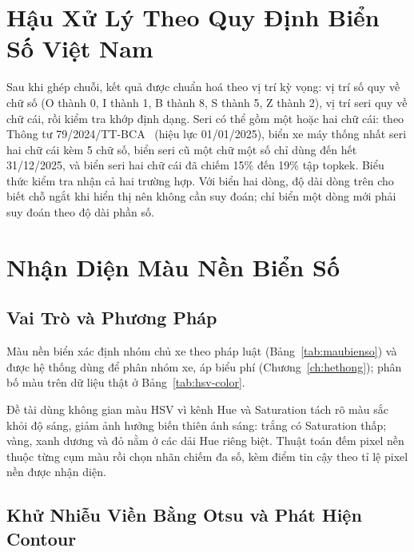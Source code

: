 \section{Hậu Xử Lý Theo Quy Định Biển Số Việt Nam}
\label{sec:ocr-hauxy}

Sau khi ghép chuỗi, kết quả được chuẩn hoá theo vị trí kỳ vọng: vị trí số quy về chữ số (O
thành 0, I thành 1, B thành 8, S thành 5, Z thành 2), vị trí seri quy về chữ cái, rồi kiểm
tra khớp định dạng. Seri có thể gồm một hoặc hai chữ cái: theo Thông tư
79/2024/TT-BCA~\autocite{tt792024bca} (hiệu lực 01/01/2025), biển xe máy thống nhất seri hai
chữ cái kèm 5 chữ số, biển seri cũ một chữ một số chỉ dùng đến hết 31/12/2025, và biển seri
hai chữ cái đã chiếm 15\% đến 19\% tập topkek. Biểu thức kiểm tra nhận cả hai trường hợp. Với
biển hai dòng, độ dài dòng trên cho biết chỗ ngắt khi hiển thị nên không cần suy đoán; chỉ
biển một dòng mới phải suy đoán theo độ dài phần số.

\section{Nhận Diện Màu Nền Biển Số}
\label{sec:mau-bien}

\subsection{Vai Trò và Phương Pháp}

Màu nền biển xác định nhóm chủ xe theo pháp luật (Bảng~\ref{tab:maubienso}) và được hệ thống
dùng để phân nhóm xe, áp biểu phí (Chương~\ref{ch:hethong}); phân bố màu trên dữ liệu thật ở
Bảng~\ref{tab:hsv-color}.

Đề tài dùng không gian màu HSV vì kênh Hue và Saturation tách rõ màu sắc khỏi độ sáng, giảm
ảnh hưởng biến thiên ánh sáng: trắng có Saturation thấp; vàng, xanh dương và đỏ nằm ở các dải
Hue riêng biệt. Thuật toán đếm pixel nền thuộc từng cụm màu rồi chọn nhãn chiếm đa số, kèm
điểm tin cậy theo tỉ lệ pixel nền được nhận diện.

\subsection{Khử Nhiễu Viền Bằng Otsu và Phát Hiện Contour}

